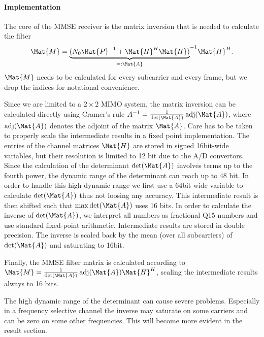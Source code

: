 \documentclass[a4paper,twocolumn,journal]{IEEEtran}
\begin{document}
\paragraph*{Implementation}

The core of the MMSE receiver is the matrix inversion that is needed to calculate the filter 
$$\Mat{M} = {\underbrace{(N_0 \Mat{P}^{-1} + \Mat{H}^H\Mat{H})}_{=:\Mat{A}}}^{-1} \Mat{H}^H.$$
$\Mat{M}$ needs to be calculated for every subcarrier and every frame, but we drop the indices for notational convenience. 
 
Since we are limited to a $2 \times 2$ MIMO system, the matrix inversion can be calculated directly using Cramer's rule $A^{-1} = \frac{1}{\operatorname{det}(\Mat{A})} \operatorname{adj}(\Mat{A})$, where $\operatorname{adj}(\Mat{A})$ denotes the adjoint of the matrix $\Mat{A}$.   
Care has to be taken to properly scale the intermediate results in a fixed point implementation. The entries of the channel matrices $\Mat{H}$ are stored in signed 16bit-wide variables, but their resolution is limited to 12 bit due to the A/D convertors. Since the calculation of the determinant $\operatorname{det}(\Mat{A})$ involves terms up to the fourth power, the dynamic range of the determinant can reach up to 48 bit. In order to handle this high dynamic range we first use a 64bit-wide variable to calculate $\operatorname{det}(\Mat{A})$ thus not loosing any accuracy. This intermediate result is then shifted such that $\max{\operatorname{det}(\Mat{A})}$ uses 16 bits. In order to calculate the inverse of $\operatorname{det}(\Mat{A})$, we interpret all numbers as fractional Q15 numbers and use standard fixed-point arithmetic. Intermediate results are stored in double precision. The inverse is scaled back by the mean (over all subcarriers) of $\operatorname{det}(\Mat{A})$ and saturating to 16bit. 

Finally, the MMSE filter matrix is calculated according to $\Mat{M} = \frac{1}{\operatorname{det}(\Mat{A})} \operatorname{adj}(\Mat{A}) \Mat{H}^H$, scaling the intermediate results always to 16 bits. 

The high dynamic range of the determinant can cause severe problems. Especially in a frequency selective channel the inverse may saturate on some carriers and can be zero on some other frequencies. This will become more evident in the result section.  
\end{document}

